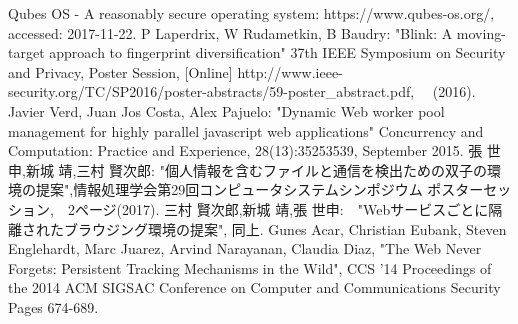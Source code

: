 \documentclass[submit,techrep]{ipsj}
\begin{document}
\begin{thebibliography}{1}

 {\small Qubes OS - A reasonably secure operating system: https://www.qubes-os.org/, accessed: 2017-11-22.}
 P Laperdrix, W Rudametkin, B Baudry: "Blink: A moving-target approach to fingerprint diversification" 37th IEEE Symposium on Security and Privacy, Poster Session, [Online]
http://www.ieee-security.org/TC/SP2016/poster-abstracts/59-poster\_abstract.pdf, 　(2016).
Javier Verd, Juan Jos Costa, Alex Pajuelo: "Dynamic Web worker pool management for highly parallel javascript web applications" Concurrency and Computation: Practice and Experience, 28(13):35253539, September 2015.
張 世申,新城 靖,三村 賢次郎: "個人情報を含むファイルと通信を検出ための双子の環境の提案",情報処理学会第29回コンピュータシステムシンポジウム ポスターセッション,　2ページ(2017).
三村 賢次郎,新城 靖,張 世申:　"Webサービスごとに隔離されたブラウジング環境の提案", 同上.
 {Gunes Acar, Christian Eubank, Steven Englehardt, Marc Juarez, Arvind Narayanan, Claudia Diaz, "The Web Never Forgets: Persistent Tracking Mechanisms in the Wild", CCS '14 Proceedings of the 2014 ACM SIGSAC Conference on Computer and Communications Security Pages 674-689. }
\end{thebibliography}
\end{document}
